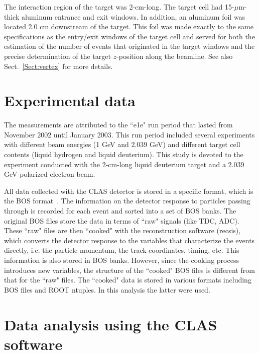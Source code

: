 The interaction region of the target was 2-cm-long. The target cell had 15-$\mu$m-thick aluminum entrance and exit windows. In addition, an aluminum foil was located 2.0 cm downstream of the target. This foil was made exactly to the same specifications as the entry/exit windows of the target cell and served for both the estimation of the number of events that originated in the target windows and the precise determination of the target $z$-position along the beamline. See also Sect.~\ref{Sect:vertex} for more details.

\section{Experimental data}
\label{Sect:data_format}

The measurements are attributed to the ``e1e" run period that lasted from November 2002 until January 2003. This run period included several experiments with different beam energies (1 GeV and 2.039 GeV) and different target cell contents (liquid hydrogen and liquid deuterium). This study is devoted to the experiment conducted with the 2-cm-long liquid deuterium target and a 2.039 GeV polarized electron beam.


All data collected with the CLAS detector is stored in a specific format, which is the BOS format~\cite{BOS:bank,Stepanyan:1999}. The information on the detector response to particles passing through is recorded for each event and sorted into a set of BOS banks. The original BOS files store the data in terms of ``raw" signals (like TDC, ADC). These ``raw" files are then ``cooked" with the reconstruction software (recsis), which converts the detector response to the variables that characterize the events directly, i.e. the particle momentum, the track coordinates, timing, etc. This information is also stored in BOS banks. However, since the cooking process introduces new variables, the structure of the ``cooked" BOS files is different from that for the ``raw" files. The ``cooked" data is stored in various formats including BOS files and ROOT ntuples. In this analysis the latter were used.%
\section{Data analysis using the CLAS software}
\label{Sect:clas_software}

